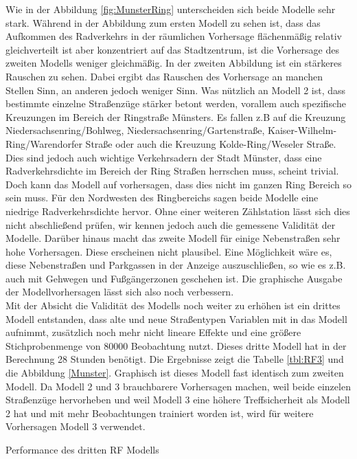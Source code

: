 \documentclass[a4paper,12pt]{thesis}
\begin{document}
Wie in der Abbildung \ref{fig:MunsterRing} unterscheiden sich beide Modelle sehr stark. Während in der Abbildung zum ersten Modell zu sehen ist, dass das Aufkommen des Radverkehrs in der räumlichen Vorhersage flächenmäßig relativ gleichverteilt ist aber konzentriert auf das Stadtzentrum, ist die Vorhersage des zweiten Modells weniger gleichmäßig. In der zweiten Abbildung ist ein stärkeres Rauschen zu sehen. Dabei ergibt das Rauschen des Vorhersage an manchen Stellen Sinn, an anderen jedoch weniger Sinn. Was nützlich an Modell 2 ist, dass bestimmte einzelne Straßenzüge stärker betont werden, vorallem auch spezifische Kreuzungen im Bereich der Ringstraße Münsters. Es fallen z.B auf die Kreuzung Niedersachsenring/Bohlweg, Niedersachsenring/Gartenstraße, Kaiser-Wilhelm-Ring/Warendorfer Straße oder auch die Kreuzung Kolde-Ring/Weseler Straße. Dies sind jedoch auch wichtige Verkehrsadern der Stadt Münster, dass eine Radverkehrsdichte im Bereich der Ring Straßen herrschen muss, scheint trivial. Doch kann das Modell auf vorhersagen, dass dies nicht im ganzen Ring Bereich so sein muss. Für den Nordwesten des Ringbereichs sagen beide Modelle eine niedrige Radverkehrsdichte hervor. Ohne einer weiteren Zählstation lässt sich dies nicht abschließend prüfen, wir kennen jedoch auch die gemessene Validität der Modelle. Darüber hinaus macht das zweite Modell für einige Nebenstraßen sehr hohe Vorhersagen. Diese erscheinen nicht plausibel. Eine Möglichkeit wäre es, diese Nebenstraßen und Parkgassen in der Anzeige auszuschließen, so wie es z.B. auch mit Gehwegen und Fußgängerzonen geschehen ist. Die graphische Ausgabe der Modellvorhersagen lässt sich also noch verbessern.\\
Mit der Absicht die Validität des Modells noch weiter zu erhöhen ist ein drittes Modell entstanden, dass alte und neue Straßentypen Variablen mit in das Modell aufnimmt, zusätzlich noch mehr nicht lineare Effekte und eine größere Stichprobenmenge von 80000 Beobachtung nutzt. Dieses dritte Modell hat in der Berechnung 28 Stunden benötigt. Die Ergebnisse zeigt die Tabelle \ref{tbl:RF3} und die Abbildung \ref{Munster}. Graphisch ist dieses Modell fast identisch zum zweiten Modell. Da Modell 2 und 3 brauchbarere Vorhersagen machen, weil beide einzelen Straßenzüge hervorheben und weil Modell 3 eine höhere Treffsicherheit als Modell 2 hat und mit mehr Beobachtungen trainiert worden ist, wird für weitere Vorhersagen Modell 3 verwendet.

\begin{table}
	\caption{Performance des dritten RF Modells}
	\label{tbl:RF3}
\end{table}
\end{document}
